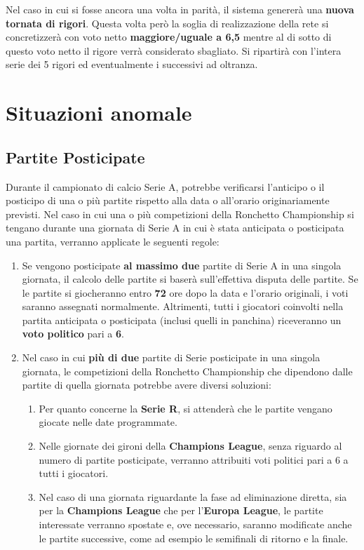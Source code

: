 \documentclass[12pt]{article}
\begin{document}
Nel caso in cui si fosse ancora una volta in parità, il sistema genererà una \textbf{nuova tornata di rigori}. Questa volta però la soglia di realizzazione della rete si concretizzerà con voto netto \textbf{maggiore/uguale a 6,5} mentre al di sotto di questo voto netto il rigore verrà considerato sbagliato. Si ripartirà con l'intera serie dei 5 rigori ed eventualmente i successivi ad oltranza.

\newpage
\section{Situazioni anomale}

\subsection{Partite Posticipate}
Durante il campionato di calcio Serie A, potrebbe verificarsi l'anticipo o il posticipo di una o più partite rispetto alla data o all'orario originariamente previsti. Nel caso in cui una o più competizioni della Ronchetto Championship si tengano durante una giornata di Serie A in cui è stata anticipata o posticipata una partita, verranno applicate le seguenti regole:

\begin{enumerate}
    \item Se vengono posticipate \textbf{al massimo due} partite di Serie A in una singola giornata, il calcolo delle partite si baserà sull'effettiva disputa delle partite. Se le partite si giocheranno entro \textbf{72} ore dopo la data e l'orario originali, i voti saranno assegnati normalmente. Altrimenti, tutti i giocatori coinvolti nella partita anticipata o posticipata (inclusi quelli in panchina) riceveranno un \textbf{voto politico} pari a \textbf{6}.
    \item Nel caso in cui \textbf{più di due} partite di Serie posticipate in una singola giornata, le competizioni della Ronchetto Championship che dipendono dalle partite di quella giornata potrebbe avere diversi soluzioni:
    \begin{enumerate}
        \item Per quanto concerne la \textbf{Serie R}, si attenderà che le partite vengano giocate nelle date programmate.
    
        \item Nelle giornate dei gironi della \textbf{Champions League}, senza riguardo al numero di partite posticipate, verranno attribuiti voti politici pari a 6 a tutti i giocatori.
        
        \item Nel caso di una giornata riguardante la fase ad eliminazione diretta, sia per la \textbf{Champions League} che per l'\textbf{Europa League}, le partite interessate verranno spostate e, ove necessario, saranno modificate anche le partite successive, come ad esempio le semifinali di ritorno e la finale.
    \end{enumerate}    
\end{enumerate}
\end{document}

